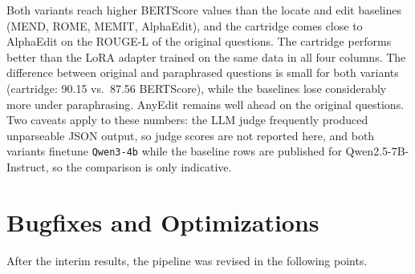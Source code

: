 \documentclass[10pt,a4paper]{article}
\begin{document}
Both variants reach higher BERTScore values than the locate and edit baselines (MEND,
ROME, MEMIT, AlphaEdit), and the cartridge comes close to AlphaEdit on the ROUGE-L of the
original questions. The cartridge performs better than the LoRA adapter trained on the
same data in all four columns. The difference between original and paraphrased questions
is small for both variants (cartridge: 90.15 vs.\ 87.56 BERTScore), while the baselines
lose considerably more under paraphrasing. AnyEdit remains well ahead on the original
questions. Two caveats apply to these numbers: the LLM judge frequently produced
unparseable JSON output, so judge scores are not reported here, and both variants
finetune \texttt{Qwen3-4b} while the baseline rows are published for Qwen2.5-7B-Instruct,
so the comparison is only indicative.

\section{Bugfixes and Optimizations}
After the interim results, the pipeline was revised in the following points.
\end{document}

